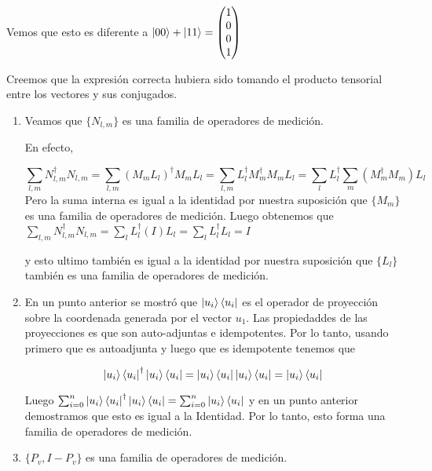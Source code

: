\documentclass[letter,twoside,12pt]{article}
\begin{document}
\begin{enumerate}
Vemos que esto es diferente a $ \ket{00}+\ket{11} = \begin{pmatrix} 1 \\ 0 \\ 0 \\ 1 \end{pmatrix}$

Creemos que la expresión correcta hubiera sido tomando el producto tensorial entre los vectores y sus conjugados.

\end{enumerate}

\begin{enumerate}
\item Veamos que $ \{N_{l,m}\} $ es una familia de operadores de medición.

En efecto,

\begin{equation}
\sum_{l,m}N_{l,m}^\dagger N_{l,m} = \sum_{l,m}(M_mL_l)^\dagger M_mL_l = \sum_{l,m}L_l^\dagger M_m^\dagger M_mL_l \nonumber = \sum_{l}L_l^\dagger \sum_{m}(M_m^\dagger M_m)L_l
 \end{equation} 
Pero la suma interna es igual a la identidad por nuestra suposición que $ \{M_m\} $ es una familia de operadores de medición. Luego obtenemos que $ \sum_{l,m}N_{l,m}^\dagger N_{l,m} =  \sum_{l}L_l^\dagger (I)L_l =  \sum_{l}L_l^\dagger L_l = I$

y esto ultimo también es igual a la identidad por nuestra suposición que $ \{L_l\} $ también es una familia de operadores de medición.

\item En un punto anterior se mostró que $ \ket{u_i}\bra{u_i} $ es el operador de proyección sobre la coordenada generada por el vector $ u_1 $. Las propiedaddes de las proyecciones es que son auto-adjuntas e idempotentes. Por lo tanto, usando primero que es autoadjunta y luego que es idempotente tenemos que

\begin{equation}
\ket{u_i}\bra{u_i}^\dagger\ket{u_i}\bra{u_i} = \ket{u_i}\bra{u_i}\ket{u_i}\bra{u_i} = \ket{u_i}\bra{u_i} \nonumber
\end{equation}

Luego $ \sum_{i = 0}^n \ket{u_i}\bra{u_i}^\dagger\ket{u_i}\bra{u_i} = \sum_{i = 0}^n \ket{u_i}\bra{u_i} $ y en un punto anterior demostramos que esto es igual a la Identidad. Por lo tanto, esto forma una familia de operadores de medición.

\item $ \{P_v, I-P_v\} $ es una familia de operadores de medición.


\end{enumerate}
\end{document}
